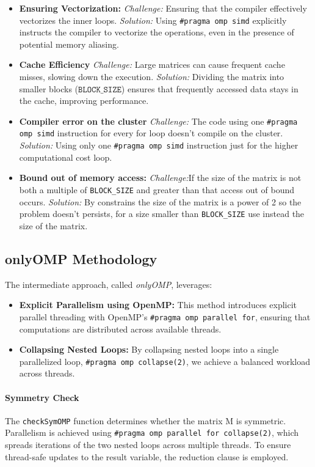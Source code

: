 \documentclass[conference]{IEEEtran}
\begin{document}
\begin{itemize}
    \item \textbf{Ensuring Vectorization:}  
    \textit{Challenge:} Ensuring that the compiler effectively vectorizes the inner loops.  
    \textit{Solution:} Using \texttt{\#pragma omp simd} explicitly instructs the compiler to vectorize the operations, even in the presence of potential memory aliasing.

    \item \textbf{Cache Efficiency}  
    \textit{Challenge:} Large matrices can cause frequent cache misses, slowing down the execution.  
    \textit{Solution:} Dividing the matrix into smaller blocks (\( \texttt{BLOCK\_SIZE} \)) ensures that frequently accessed data stays in the cache, improving performance.

    \item \textbf{Compiler error on the cluster}  
    \textit{Challenge:} The code using one \texttt{\#pragma omp simd} instruction for every for loop doesn't compile on the cluster.
    \textit{Solution:} Using only one \texttt{\#pragma omp simd} instruction just for the higher computational cost loop.
    \item \textbf{Bound out of memory access:}  
\textit{Challenge:}If the size of the matrix is not both a multiple of  \texttt{BLOCK\_SIZE} and greater than that access out of bound occurs. 
\textit{Solution:} By constrains the size of the matrix is a power of 2 so the problem doesn't persists, for a size smaller than  \texttt{BLOCK\_SIZE} use instead the size of the matrix.
\end{itemize}
\subsection{onlyOMP Methodology} 
The intermediate approach, called \textit{onlyOMP}, leverages: \begin{itemize} \item \textbf{Explicit Parallelism using OpenMP:} This method introduces explicit parallel threading with OpenMP's \texttt{\#pragma omp parallel for}, ensuring that computations are distributed across available threads. \item \textbf{Collapsing Nested Loops:} By collapsing nested loops into a single parallelized loop, \texttt{\#pragma omp collapse(2)}, we achieve a balanced workload across threads. \end{itemize}

\paragraph{Symmetry Check} The \texttt{checkSymOMP} function determines whether the matrix 
M is symmetric. Parallelism is achieved using \texttt{\#pragma omp parallel for collapse(2)}, which spreads iterations of the two nested loops across multiple threads. To ensure thread-safe updates to the result variable, the reduction clause is employed.
\end{document}
